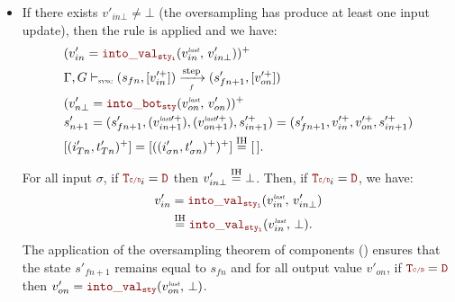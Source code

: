 \begin{skippableproof}
\begin{itemize}
\begin{align*}
                               & \Rightarrow \CurrVal{sty}{[v_{0\bot}, \dots, v_{n-1\bot}, \bot, v'_{n+1\bot}]} = \CurrVal{sty}{[v_{0\bot}, \dots, v_{n-1\bot}, v_{n\bot}]}       \\
                               & \Rightarrow \CurrVal{sty}{[v_{0\bot}, \dots, v_{n-1\bot}, v'_{n\bot}, v'_{n+1\bot}]} = \CurrVal{sty}{[v_{0\bot}, \dots, v_{n-1\bot}, v_{n\bot}]} \\
                               & \qquad \text{\cf \Cref{rule:semantics:grfrp:opsem:aux:intoVal:signal,rule:semantics:grfrp:opsem:aux:intoVal:event}}                              \\
                               & [(i'_{Tn+1}, t'_{Tn+1})^+] = [((i'_{\sigma n+1}, t'_{\sigma n+1})^+)^+] \myeq{IH} [((i_{\sigma n}, t_{\sigma n})^+)^+] = [(i_{Tn}, t_{Tn})^+].
              \end{align*}
        \item If there exists $v'_{in\bot} \neq \bot$ (the oversampling has produce at least one
              input update), then the rule  is
              applied and we have:
              \begin{align*}
                   & (v'_{in} = \intoVal{sty_i}{v_{in}^{\explast}}{v'_{in\bot}})^+                                          \\
                   & \compOpsem{s_{fn}}{v_{in}^{\prime+}}{f}{s'_{fn+1}}{v_{on}^{\prime+}}                                   \\
                   & (v'_{n\bot} = \intoBot{sty}{v_{on}^{\explast}}{v'_{on}})^+                                             \\
                   & s'_{n+1} = (s'_{fn+1}, (v_{in+1}^{\explast\prime+}), (v_{on+1}^{\explast\prime+}), s_{in+1}^{\prime+})
                  = (s'_{fn+1}, v_{in}^{\prime+}, v_{on}^{\prime+}, s_{in+1}^{\prime+})                                     \\
                   & [(i'_{Tn}, t'_{Tn})^+] = [((i'_{\sigma n},t'_{\sigma n})^+)^+] \myeq{IH} \emptylist.
              \end{align*}

              For all input $\sigma$, if $\rType_i = \dType$ then $v'_{in\bot} \overset{\mathrm{IH}}{=} \bot$.
              Then, if $\rType_i = \dType$, we have:
              \begin{equation*}
                  \begin{split}
                      v'_{in} & = \intoVal{sty_i}{v_{in}^{\explast}}{v'_{in\bot}}   \\
                              & \myeq{IH} \intoVal{sty_i}{v_{in}^{\explast}}{\bot}.
                  \end{split}
              \end{equation*}
              The application of the oversampling theorem of components
              () ensures that the state $s'_{fn+1}$
              remains equal to $s_{fn}$ and for all output value $v'_{on}$, if $\rType = \dType$
              then $v'_{on} = \intoVal{sty}{v_{on}^{\explast}}{\bot}$.


\end{itemize}
\end{skippableproof}
